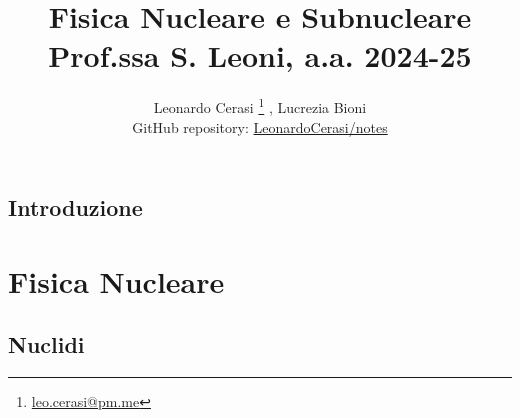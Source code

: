 \documentclass[a4paper, 12pt, openany]{book}
\author{Leonardo Cerasi%
	\thanks{\scriptsize\href{mailto:leonardo.cerasi@studenti.unimi.it}{leo.cerasi@pm.me}}%
	, Lucrezia Bioni\\
	\small GitHub repository: \href{https://github.com/LeonardoCerasi/notes}{LeonardoCerasi/notes}}
\title{\Huge\textbf{Fisica Nucleare e Subnucleare} \\ \large Prof.ssa S. Leoni, a.a. 2024-25}
\begin{document}
\frontmatter

\maketitle
\tableofcontents

\mainmatter

\chapter*{Introduzione}


\part{Fisica Nucleare}

\chapter{Nuclidi}

\end{document}
